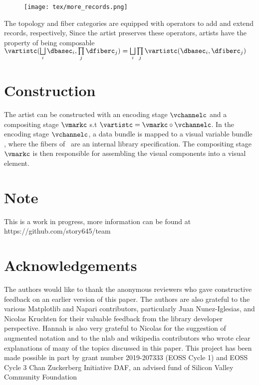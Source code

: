 \documentclass[11pt,titlepage]{amsart}
\begin{document}
\begin{figure*}[h]
\texttt{[image: tex/more\_records.png]}
\end{figure*}

The topology and fiber categories are equipped with operators to add and extend records, respectively, Since the artist preserves these operators, artists have the property of being composable $\vartistc(\bigsqcup\limits_{i}\dbasec_i, \prod\limits_j\dfiberc_j) = \bigsqcup\limits_i\prod\limits_j\vartistc(\dbasec_i, \dfiberc_j)$


\section{Construction}
The artist can be constructed with an encoding stage $\vchannelc$ and a compositing stage $\vmarkc$ s.t $\vartistc=\vmarkc\circ\vchannelc$. In the \textcolor{artist}{encoding} stage $\vchannelc$, a data bundle is mapped to a visual variable bundle \vchannel, where the fibers of \vchannel\ are an internal library specification. The \textcolor{artist}{compositing} stage $\vmarkc$ is then responsible for assembling  the visual components into a visual element.

\section*{Note}
This is a work in progress, more information can be found at https://github.com/story645/team

\section*{Acknowledgements}
The authors would like to thank the anonymous reviewers who gave constructive feedback on an earlier version of this paper. The authors are also grateful to  the various Matplotlib and Napari contributors, particularly Juan Nunez-Iglesias, and Nicolas Kruchten for their valuable feedback from the library developer perspective. Hannah is also very grateful to Nicolas for the suggestion of augmented notation and to the nlab and wikipedia contributors who wrote clear explanations of many of the topics discussed in this paper. This project has been made possible in part by grant number 2019-207333 (EOSS Cycle 1) and EOSS Cycle 3 Chan Zuckerberg Initiative DAF, an advised fund of Silicon Valley Community Foundation




\end{document}
